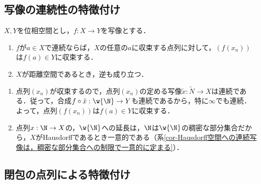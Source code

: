 \documentclass[uplatex,dvipdfmx]{jsreport}
\begin{document}
\subsection{写像の連続性の特徴付け}

\begin{corollary}[連続性の極限の言葉による特徴付け]\label{cor-characterization-of-continuousness-in-terms-of-limits}
    $X,Y$を位相空間とし，$f:X\to Y$を写像とする．
    \begin{enumerate}
        \item $f$が$a\in X$で連続ならば，$X$の任意の$a$に収束する点列に対して，$(f(x_n))$は$f(a)\in Y$に収束する．
        \item $X$が距離空間であるとき，逆も成り立つ．
    \end{enumerate}
\end{corollary}
\begin{Proof}\mbox{}
    \begin{enumerate}
        \item 点列$(x_n)$が収束するので，点列$(x_n)$の定める写像$\tilde{x}:\widetilde{N}\to X$は連続である．従って，合成$f\circ\tilde{x}:\w{\N}\to Y$も連続であるから，特に$\infty$でも連続．よって，点列$(f(x_n))$は$f(a)\in Y$に収束する．
        \item 点列$x:\N\to X$の，$\w{\N}$への延長は，$\N$は$\w{\N}$の稠密な部分集合だから，$X$がHausdorffであるとき一意的である（系\ref{cor-Hausdorff空間への連続写像は，稠密な部分集合への制限で一意的に定まる}）．
    \end{enumerate}
\end{Proof}

\subsection{閉包の点列による特徴付け}
\end{document}
